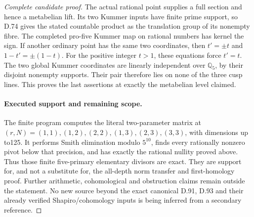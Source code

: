 \begin{proof}[Complete candidate proof]
The actual rational point supplies a full section and hence
a metabelian lift. Its two Kummer inputs have finite prime
support, so D.74 gives the stated countable product as the
translation group of its nonempty fibre. The completed
pro-five Kummer map on rational numbers has kernel the sign.
If another ordinary point has the same two coordinates,
then \(t'=\pm t\) and \(1-t'=\pm(1-t)\). For the positive
integer \(t>1\), these equations force \(t'=t\).
The two global Kummer coordinates are linearly independent
over \(\mathbb Q_5\), by their disjoint nonempty supports.
Their pair therefore lies on none of the three cusp lines.
This proves the last assertions at exactly the metabelian
level claimed.

\paragraph{Executed support and remaining scope.}
The finite program 
computes the literal two-parameter matrix at
\((r,N)=(1,1),(1,2),(2,2),(1,3),(2,3),(3,3)\), with dimensions
up to125. It performs Smith elimination modulo \(5^{10}\),
finds every rationally nonzero pivot below that precision,
and has exactly the rational nullity proved above. Thus those
finite five-primary elementary divisors are exact. They are
support for, and not a substitute for, the all-depth norm
transfer and first-homology proof. Further arithmetic,
cohomological and obstruction claims remain outside the
statement. No new source beyond the exact canonical D.91,
D.93 and their already verified Shapiro/cohomology inputs is
being inferred from a secondary reference.
\end{proof}
